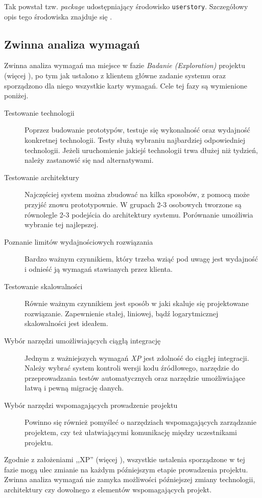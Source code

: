 Tak powstał tzw. \textit{package} udostępniający środowisko \texttt{userstory}. Szczegółowy opis tego środowiska znajduje się .

\subsection{Zwinna analiza wymagań}
\label{sec:ZMTOzwinnaAnalizaWymagan}

Zwinna analiza wymagań ma miejsce w fazie \textit{Badanie (Exploration)} projektu (więcej ), po tym jak ustalono z klientem główne zadanie systemu oraz sporządzono dla niego wszystkie karty wymagań. Cele tej fazy są wymienione poniżej.

\begin{description}
    \item[Testowanie technologii]{Poprzez budowanie prototypów, testuje się wykonalność oraz wydajność konkretnej technologii. Testy służą wybraniu najbardziej odpowiedniej technologii. Jeżeli uruchomienie jakiejś technologii trwa dłużej niż tydzień, należy zastanowić się nad alternatywami.}
    \item[Testowanie architektury]{Najczęściej system można zbudować na kilka sposobów, z pomocą może przyjść znowu prototypownie. W grupach 2-3 osobowych tworzone są równolegle 2-3 podejścia do architektury systemu. Porównanie umożliwia wybranie tej najlepszej.}
    \item[Poznanie limitów wydajnościowych rozwiązania]{Bardzo ważnym czynnikiem, który trzeba wziąć pod uwagę jest wydajność i odnieść ją wymagań stawianych przez klienta.}
    \item[Testowanie skalowalności]{Równie ważnym czynnikiem jest sposób w jaki skaluje się projektowane rozwiązanie. Zapewnienie stałej, liniowej, bądź logarytmicznej skalowalności jest ideałem.}
    \item[Wybór narzędzi umożliwiających ciągłą integrację]{Jednym z ważniejszych wymagań \textit{XP} jest zdolność do ciągłej integracji. Należy wybrać system kontroli wersji kodu źródłowego, narzędzie do przeprowadzania testów automatycznych oraz narzędzie umożliwiające łatwą i pewną migrację danych.}
    \item[Wybór narzędzi wspomagających prowadzenie projektu]{Powinno się również pomyśleć o narzędziach wspomagających zarządzanie projektem, czy też ułatwiającymi komunikację między uczestnikami projektu.}
\end{description}

Zgodnie z założeniami ,,XP'' (więcej ), wszystkie ustalenia sporządzone w tej fazie mogą ulec zmianie na każdym późniejszym etapie prowadzenia projektu. Zwinna analiza wymagań nie zamyka możliwości późniejszej zmiany technologii, architektury czy dowolnego z elementów wspomagających projekt.

\newpage
